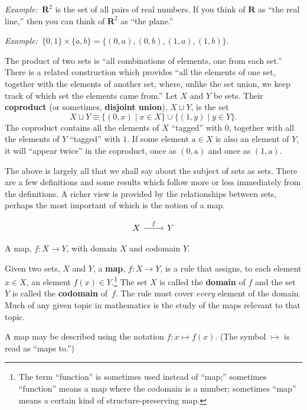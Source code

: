 \documentclass[12pt, a4paper]{article}
\newcommand{\defn}[1]{\textbf{#1}}
\newcommand{\set}[1]{\mathbold{#1}}
\newcommand{\eg}{\emph{Example:}\relax}
\begin{document}
\eg\ $\set{R}^2$ is the set of all pairs of real numbers. If you think
of $\set{R}$ as ``the real line,'' then you can think of $\set{R}^2$
as ``the plane.''

\eg\ $\{0,1\}\times\{a, b\} = \{(0,a), (0,b), (1,a), (1,b)\}$. 

The product of two sets is “all combinations of elements, one from
each set.” There is a related construction which provides “all the
elements of one set, together with the elements of another set, where,
unlike the set union, we keep track of which set the elements came
from.” Let $X$ and $Y$ be sets. Their \defn{coproduct} (or sometimes,
\defn{disjoint union}), $X \sqcup Y$, is the set
\begin{equation*}
  X \sqcup Y \equiv \{(0,x) \mid x\in X\} \cup \{(1, y)\mid y\in Y\}.
\end{equation*}
The coproduct contains all the elements of $X$ “tagged” with $0$,
together with all the elements of $Y$ “tagged” with $1$. If some
element $\text{a}\in X$ is also an element of $Y$, it will “appear twice” in the
coproduct, once as $(0,\text{a})$ and once as $(1,\text{a})$. 

The above is largely all that we shall say about the subject of sets
as sets. There are a few definitions and some results which follow
more or less immediately from the definitions. A richer view is
provided by the relationships between sets, perhaps the most important
of which is the notion of a map.

\begin{sidefigure}
  \[\begin{tikzcd}
    X \arrow[r, "f"] & Y
  \end{tikzcd}\]
  \caption{A map, $f\colon X\to Y$, with domain $X$ and codomain $Y$.}
\end{sidefigure}
Given two sets, $X$ and $Y$, a \defn{map}, $f\colon X \to Y$, is a rule
that assigns, to each element $x \in X$, an element $f(x) \in
Y$.\footnote{The term “function” is sometimes used instead of “map;”
sometimes “function” means a map where the codomain is a number;
sometimes “map” means a certain kind of structure-preserving map.} The
set $X$ is called the \defn{domain} of $f$ and the set $Y$ is called
the \defn{codomain} of~$f$. The rule must cover \emph{every} element
of the domain. Much of any given topic in mathematics is the study of
the maps relevant to that topic.

A map may be described using the notation $f\colon x\mapsto f(x)$. (The
symbol $\mapsto$ is read as ``maps to.'')
\end{document}
